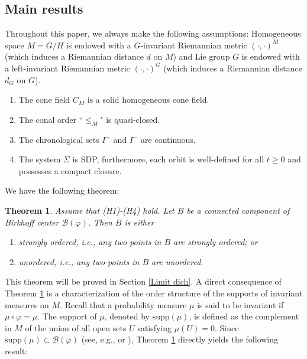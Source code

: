 \documentclass[a4paper,11pt]{article}
\theoremstyle{plain}
\newtheorem{thm}{Theorem}[section]
\theoremstyle{definition}
\numberwithin{equation}{section}
\begin{document}
\subsection{Main results}\label{mr}


Throughout this paper, we always make the following assumptions:
Homogeneous space $M=G/H$ is endowed with a $G$-invariant Riemannian metric $(\cdot,\cdot)^{M}$ (which induces a Riemannian distance $d$ on $M$) and Lie group $G$ is endowed with a left-invariant Riemannian metric $(\cdot,\cdot)^{G}$ (which induces a Riemannian distance $d_G$ on $G$).

\begin{enumerate}
	\item[{\bf (H1)}] The cone field $C_M$ is a solid homogeneous cone field. 
	\item[{\bf (H2)}] The conal order ``$\leq_M$" is quasi-closed. %
	\item[{\bf (H3)}] The chronological sets $I^+$ and $I^-$ are continuous.
	\item[{\bf (H4)}] The system $\Sigma$ is {\rm SDP}, furthermore, each orbit is well-defined for all $t\geq 0$ and possesses a compact closure.
\end{enumerate}



We have the following theorem:



\begin{thm}\label{Thm_2.1}
	Assume that  {\rm (H1)-(H4)} hold. Let $B$ be a connected component of Birkhoff center $\mathcal{B}(\varphi)$. Then $B$ is either
	\begin{enumerate}[{\rm(i)}]
		\item strongly ordered, i.e., any two points in $B$ are strongly ordered; or
		\item unordered, i.e., any two points in $B$ are unordered.
	\end{enumerate}
\end{thm}

This theorem will be proved in Section \ref{Limit dich}. A direct consequence of Theorem \ref{Thm_2.1} is a characterization of the order structure of the supports of invariant measures on $M$. Recall that a probability measure $\mu$ is said to be invariant if $\mu \circ \varphi=\mu$. The support of $\mu$, denoted by $\text{supp} (\mu)$, is defined as the complement in $M$ of the union of all open sets $U$ satisfying $\mu(U)=0$. Since $\text{supp}(\mu)\subset \mathcal{B}(\varphi)$ (see, e.g., \cite[p.28]{M12} or \cite[Appendix A]{J20}), Theorem \ref{Thm_2.1} directly yields the following result:
\end{document}
